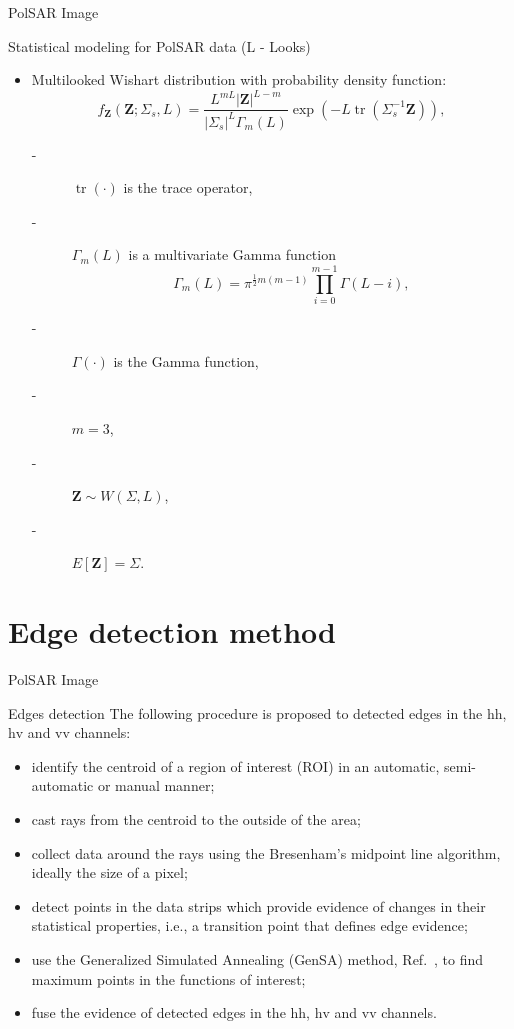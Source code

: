 \documentclass[10pt]{beamer}
\DeclareMathOperator{\traco}{tr} %
\begin{document}
\begin{frame}[fragile]{PolSAR Image}
\begin{alertblock}{Statistical modeling for PolSAR data (L - Looks)}
\begin{itemize}
\item Multilooked Wishart distribution with probability density function:
\begin{equation}
    f_{\mathbf{Z}}(\mathbf{Z};\Sigma_{s},L)=\frac{L^{mL}|\mathbf{Z}|^{L-m}}{|\Sigma_{s}|^{L}\Gamma_m(L)} \exp(-L\traco(\Sigma_{s}^{-1}\mathbf{Z})),
    \label{eq_04}
\end{equation} 
\begin{description}
\item[-] $\traco(\cdot)$ is the trace operator,
\item[-] $\Gamma_m(L)$ is a multivariate Gamma function
\begin{equation*}
	\Gamma_m(L)=\pi^{\frac{1}{2}m(m-1)} \prod_{i=0}^{m-1}\Gamma(L-i),
\end{equation*}
\item[-]$\Gamma(\cdot)$ is the Gamma function,
\item[-]$m=3$,
\item[-]$\mathbf{Z}\sim W(\Sigma, L)$, 
\item[-]$E[\mathbf{Z}]=\Sigma$. 
\end{description} 
\end{itemize}
\end{alertblock}
\end{frame}

\section{Edge detection method}
\begin{frame}[fragile]{PolSAR Image}
\begin{alertblock}{Edges detection}
The following procedure is proposed to detected edges in the $\text{hh}$, $\text{hv}$ and $\text{vv}$ channels:
\begin{itemize}
	\item identify the centroid of a region of interest (ROI) in an automatic, semi-automatic or manual manner;
	\item cast rays from the centroid to the outside of the area;
	\item collect data around the rays using the  Bresenham's midpoint line algorithm, ideally the size of a pixel;
	\item detect points in the data strips which provide evidence of changes in their statistical properties, i.e., a transition point that defines edge evidence;
	\item use the Generalized Simulated Annealing (GenSA) method, Ref.~\cite{xgsh}, to find maximum points in the functions of interest;
	\item fuse the evidence of detected edges in the $\text{hh}$, $\text{hv}$ and $\text{vv}$ channels.
\end{itemize}
\end{alertblock}
\end{frame}
\end{document}
